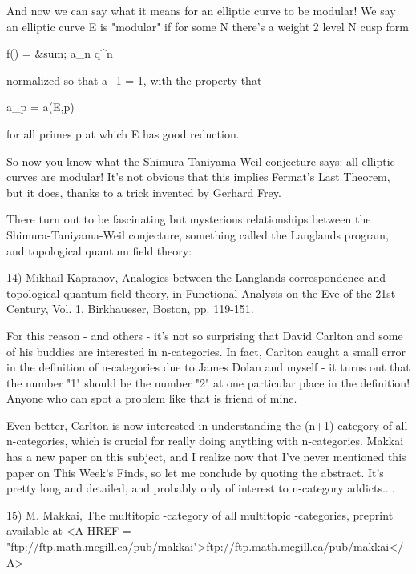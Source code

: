 And now we can say what it means for an elliptic curve to be modular!
We say an elliptic curve E is "modular" if for some N
there's a weight 2 level N cusp form

f(\tau ) = &sum; a_{n} q^{n}

normalized so that a_{1} = 1, with the property that

a_{p} = a(E,p)

for all primes p at which E has good reduction.  

So now you know what the Shimura-Taniyama-Weil conjecture says:
all elliptic curves are modular!  It's not obvious that this implies
Fermat's Last Theorem, but it does, thanks to a trick invented by
Gerhard Frey.

There turn out to be fascinating but mysterious relationships between
the Shimura-Taniyama-Weil conjecture, something called the Langlands
program, and topological quantum field theory:

14) Mikhail Kapranov, Analogies between the Langlands correspondence
and topological quantum field theory, in Functional Analysis on the 
Eve of the 21st Century, Vol. 1, Birkhaueser, Boston, pp. 119-151.

For this reason - and others - it's not so surprising that David
Carlton and some of his buddies are interested in n-categories.  In
fact, Carlton caught a small error in the definition of n-categories
due to James Dolan and myself - it turns out that the number
"1" should be the number "2" at one particular
place in the definition!  Anyone who can spot a problem like that is
friend of mine.

Even better, Carlton is now interested in understanding the (n+1)-category 
of all n-categories, which is crucial for really doing anything with 
n-categories.  Makkai has a new paper on this subject, and I realize now 
that I've never mentioned this paper on This Week's Finds, so let me 
conclude by quoting the abstract.  It's pretty long and detailed, and
probably only of interest to n-category addicts....

15) M. Makkai, The multitopic \omega -category of all multitopic 
\omega -categories, preprint available at <A HREF = "ftp://ftp.math.mcgill.ca/pub/makkai">ftp://ftp.math.mcgill.ca/pub/makkai</A>

